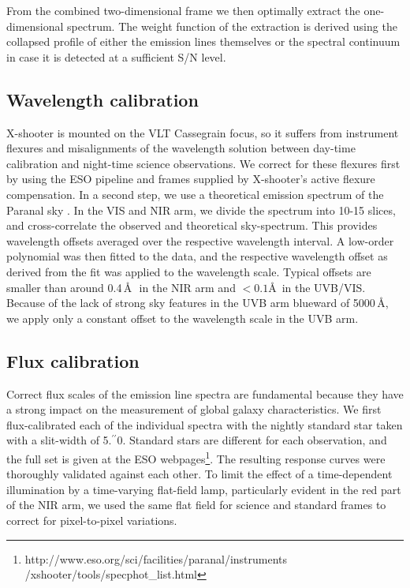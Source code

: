 \documentclass[traditabstract, longauth]{aa}
\newcommand{\farc}{\hbox{$.\!\!^{\prime\prime}$}}
\begin{document}
From the combined two-dimensional frame we then optimally extract the one-dimensional spectrum. The weight function of the extraction is derived using the collapsed profile of either the emission lines themselves or the spectral continuum in case it is detected at a sufficient S/N level.

\subsection{Wavelength calibration}
\label{sec:wavecal}

X-shooter is mounted on the VLT Cassegrain focus, so it suffers from instrument flexures and misalignments of the wavelength solution between day-time calibration and night-time science observations. We correct for these flexures first by using the ESO pipeline and frames supplied by X-shooter's active flexure compensation. In a second step, we use a theoretical emission spectrum of the Paranal sky \citep{2012A&A...543A..92N}. In the VIS and NIR arm, we divide the spectrum into 10-15 slices, and cross-correlate the observed and theoretical sky-spectrum. This provides wavelength offsets averaged over the respective wavelength interval. A low-order polynomial was then fitted to the data, and the respective wavelength offset as derived from the fit was applied to the wavelength scale. Typical offsets are smaller than around 0.4\,\AA\,\ in the NIR arm and $<0.1$\AA\, in the UVB/VIS. Because of the lack of strong sky features in the UVB arm blueward of 5000\,\AA, we apply only a constant offset to the wavelength scale in the UVB arm.

\subsection{Flux calibration}
\label{FluxCal}

Correct flux scales of the emission line spectra are fundamental because they have a strong impact on the measurement of global galaxy characteristics. We first flux-calibrated each of the individual spectra with the nightly standard star taken with a slit-width of 5\farc{0}. Standard stars are different for each observation, and the full set is given at the ESO webpages\footnote{http://www.eso.org/sci/facilities/paranal/instruments\\/xshooter/tools/specphot\_list.html}. The resulting response curves were thoroughly validated against each other. To limit the effect of a time-dependent illumination by a time-varying flat-field lamp, particularly evident in the red part of the NIR arm, we used the same flat field for science and standard frames to correct for pixel-to-pixel variations.
\end{document}
